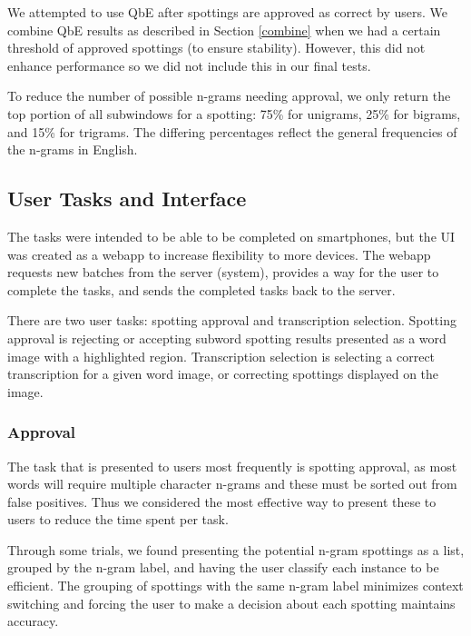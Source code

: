 \documentclass[ms,electronic,twosidetoc,letterpaper,chaptercenter,parttop,lof,lot]{byumsphd}
\begin{document}
We attempted to use QbE after spottings are approved as correct by users. We combine QbE results as described in Section \ref{combine} when we had a certain threshold of approved spottings (to ensure stability). However, this did not enhance performance so we did not include this in our final tests.

To reduce the number of possible n-grams needing approval, we only return the top portion of all subwindows for a spotting: 75\% for unigrams, 25\% for bigrams, and 15\% for trigrams. The differing percentages reflect the general frequencies of the n-grams in English.

\subsection{User Tasks and Interface}

The tasks were intended to be able to be completed on smartphones, but the UI was created as a webapp to increase flexibility to more devices. The webapp requests new batches from the server (system), provides a way for the user to complete the tasks, and sends the completed tasks back to the server.

There are two user tasks: spotting approval and transcription selection. Spotting approval is rejecting or accepting subword spotting results presented as a word image with a highlighted region. Transcription selection is selecting a correct transcription for a given word image, or correcting spottings displayed on the image. 

\subsubsection{Approval}

The task that is presented to users most frequently is spotting approval, as most words will require multiple character n-grams and these must be sorted out from false positives. Thus we considered the most effective way to present these to users to reduce the time spent per task.


Through some trials, we found presenting the potential n-gram spottings as a list, grouped by the n-gram label, and having the user classify each instance to be efficient. The grouping of spottings with the same n-gram label minimizes context switching and forcing the user to make a decision about each spotting maintains accuracy.
\end{document}
